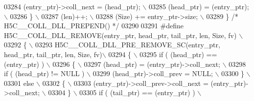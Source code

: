 \begin{DoxyCode}
03284 \textcolor{preprocessor}{       (entry\_ptr)->coll\_next = (head\_ptr);                                  \(\backslash\)}
03285 \textcolor{preprocessor}{       (head\_ptr) = (entry\_ptr);                                             \(\backslash\)}
03286 \textcolor{preprocessor}{    \}                                                                        \(\backslash\)}
03287 \textcolor{preprocessor}{    (len)++;                                                                 \(\backslash\)}
03288 \textcolor{preprocessor}{    (Size) += entry\_ptr->size;                                               \(\backslash\)}
03289 \textcolor{preprocessor}{\} }\textcolor{comment}{/* H5C\_\_COLL\_DLL\_PREPEND() */}\textcolor{preprocessor}{}
03290 
03291 \textcolor{preprocessor}{#define H5C\_\_COLL\_DLL\_REMOVE(entry\_ptr, head\_ptr, tail\_ptr, len, Size, fv)   \(\backslash\)}
03292 \textcolor{preprocessor}{\{                                                                            \(\backslash\)}
03293 \textcolor{preprocessor}{    H5C\_\_COLL\_DLL\_PRE\_REMOVE\_SC(entry\_ptr, head\_ptr, tail\_ptr, len, Size, fv)\(\backslash\)}
03294 \textcolor{preprocessor}{    \{                                                                        \(\backslash\)}
03295 \textcolor{preprocessor}{       if ( (head\_ptr) == (entry\_ptr) )                                      \(\backslash\)}
03296 \textcolor{preprocessor}{       \{                                                                     \(\backslash\)}
03297 \textcolor{preprocessor}{          (head\_ptr) = (entry\_ptr)->coll\_next;                               \(\backslash\)}
03298 \textcolor{preprocessor}{          if ( (head\_ptr) != NULL )                                          \(\backslash\)}
03299 \textcolor{preprocessor}{             (head\_ptr)->coll\_prev = NULL;                                   \(\backslash\)}
03300 \textcolor{preprocessor}{       \}                                                                     \(\backslash\)}
03301 \textcolor{preprocessor}{       else                                                                  \(\backslash\)}
03302 \textcolor{preprocessor}{       \{                                                                     \(\backslash\)}
03303 \textcolor{preprocessor}{          (entry\_ptr)->coll\_prev->coll\_next = (entry\_ptr)->coll\_next;        \(\backslash\)}
03304 \textcolor{preprocessor}{       \}                                                                     \(\backslash\)}
03305 \textcolor{preprocessor}{       if ( (tail\_ptr) == (entry\_ptr) )                                      \(\backslash\)}

\end{DoxyCode}
